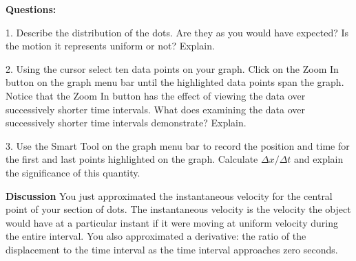 \medskip

{\noindent \bf Questions:}

1. Describe the distribution of the dots. Are they as you would have expected?
Is the motion it represents uniform or not? Explain. 
\vspace{20mm}

2. Using the cursor select ten data points on your graph. Click on the Zoom
In button on the graph menu bar until the highlighted data points span the graph.
Notice that the Zoom In button has the effect of viewing the data over successively
shorter time intervals. What does examining the data over successively shorter
time intervals demonstrate? Explain.
\vspace{20mm}

3. Use the Smart Tool on the graph menu bar to record the position and time
for the first and last points highlighted on the graph. Calculate \( \Delta x/\Delta t \)
and explain the significance of this quantity.
\vspace{20mm}

{\noindent \bf Discussion} You just approximated the instantaneous velocity for the central point of your section of dots. The instantaneous velocity is the velocity the object would have at a particular instant if it were moving at uniform velocity during the entire interval. You also approximated a derivative: the ratio of the displacement to the time interval as the time interval approaches zero seconds. \\


